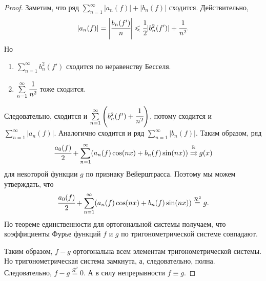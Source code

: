 \begin{proof}
	Заметим, что ряд $\sum\limits_{n=1}^{\infty} |a_n(f)| + |b_n(f)|$ сходится. Действительно,
	$$
		|a_n(f)| = \left|\cfrac{b_n(f')}{n}\right| \leqslant \cfrac{1}{2} |b_n^2(f')| + \cfrac{1}{n^2}.
	$$
	Но
	\begin{enumerate}
		\item $\sum\limits_{n=1}^{\infty} b_n^2(f')$ сходится по неравенству Бесселя.
		\item $\sum\limits_{n=1}^{\infty} \cfrac{1}{n^2}$ тоже сходится.
	\end{enumerate}
	Следовательно, сходится и $\sum\limits_{n=1}^{\infty}\left(b_n^2(f') + \cfrac{1}{n^2}\right)$, потому сходится и $\sum \limits_{n=1}^{\infty}|a_n(f)|$. Аналогично сходится и ряд $\sum \limits_{n=1}^{\infty}|b_n(f)|$. Таким образом, ряд 
	$$
		\cfrac{a_0(f)}{2} + \sum\limits_{n=1}^{\infty}(a_n(f)\cos(nx)+ b_n(f)\sin(nx)) \overset{\mathbb{R}}{\rightrightarrows} g(x)
	$$
	для некоторой функции $g$ по признаку Вейерштрасса. Поэтому мы можем утверждать, что
	$$
		\cfrac{a_0(f)}{2} + \sum\limits_{n=1}^{\infty}(a_n(f)\cos(nx)+ b_n(f)\sin(nx)) \overset{\mathcal{R}^2}{=} g.
	$$
	По теореме единственности для ортогональной системы получаем, что коэффициенты Фурье функций $f$ и $g$ по тригонометрической системе совпадают.
	\par Таким образом, $f-g$ ортогональна всем элементам тригонометрической системы. Но тригонометрическая система замкнута, а, следовательно, полна. Следовательно, $f-g \overset{\mathcal{R}^2}{=} 0$. А в силу непрерывности $f \equiv g$.
\end{proof}

